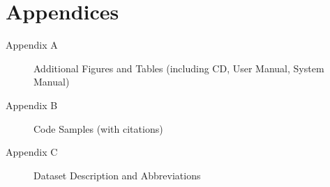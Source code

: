 \section*{Appendices}

\begin{description}
    \item[Appendix A] Additional Figures and Tables (including CD, User Manual, System Manual)
    \item[Appendix B] Code Samples (with citations)
    \item[Appendix C] Dataset Description and Abbreviations
\end{description}





